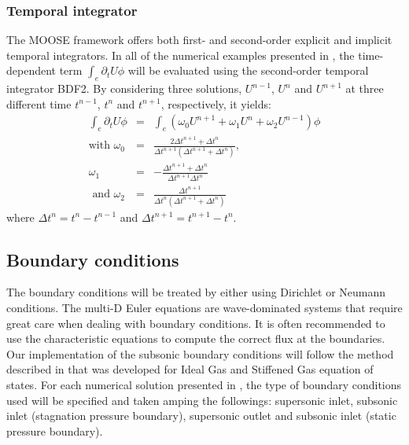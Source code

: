 \subsubsection{Temporal integrator} 
The MOOSE framework offers both first- and second-order explicit and implicit temporal integrators. In all of the numerical examples presented in , the time-dependent term $\int_{e} \partial_t U \phi$ will be evaluated using the second-order temporal integrator BDF2. By considering three solutions, $U^{n-1}$, $U^n$ and $U^{n+1}$ at three different time $t^{n-1}$, $t^n$ and $t^{n+1}$, respectively, it yields:
\begin{eqnarray}
\label{eq:BDF2}
\int_{e} \partial_t U \phi &=& \int_{e} \left( \omega_0 U^{n+1}  + \omega_1 U^n + \omega_2 U^{n-1} \right) \phi\\
\text{with }\omega_0 &=&\frac{2\Delta t^{n+1}+\Delta t^n}{\Delta t^{n+1} \left( \Delta t^{n+1}+\Delta t^n \right)} \text{, } \nonumber \\
\omega_1 &=& -\frac{\Delta t^{n+1}+\Delta t^n}{\Delta t^{n+1} \Delta t^n}\nonumber \\
\text{ and } \omega_2 &=& \frac{\Delta t^{n+1}}{\Delta t^n \left( \Delta t^{n+1} + \Delta t^n \right)} \nonumber
\end{eqnarray}
where $\Delta t^{n} = t^n-t^{n-1}$ and $\Delta t^{n+1} = t^{n+1}-t^{n}$.
\subsection{Boundary conditions} \label{sec:bc}
The boundary conditions will be treated by either using Dirichlet or Neumann conditions. The multi-D Euler equations are wave-dominated systems that require great care when dealing with boundary conditions. It is often recommended to use the characteristic equations to compute the correct flux at the boundaries. Our implementation of the subsonic boundary conditions will follow the method described in \cite{SEM} that was developed for Ideal Gas and Stiffened Gas equation of states. For each numerical solution presented in , the type of boundary conditions used will be specified and taken amping the followings: supersonic inlet, subsonic inlet (stagnation pressure boundary), supersonic outlet and subsonic inlet (static pressure boundary).
